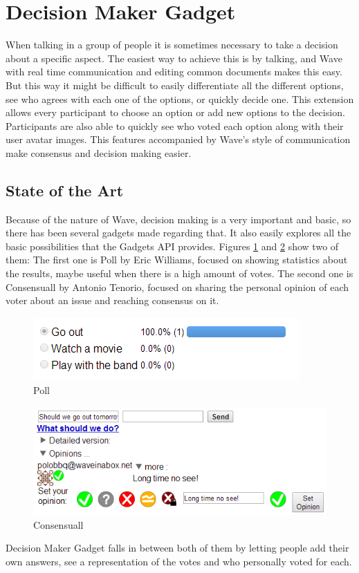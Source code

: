 \section{Decision Maker Gadget}
When talking in a group of people it is sometimes necessary to take a decision about a specific aspect. The easiest way to achieve this is by talking, and Wave with real time communication and editing common documents makes this easy. But this way it might be difficult to easily differentiate all the different options, see who agrees with each one of the options, or quickly decide one. This extension allows every participant to choose an option or add new options to the decision. Participants are also able to quickly see who voted each option along with their user avatar images. This features accompanied by Wave's style of communication make consensus and decision making easier.

\label{subsec:decision_soa}
\subsection{State of the Art}
Because of the nature of Wave, decision making is a very important and basic, so there has been several gadgets made regarding that. It also easily explores all the basic possibilities that the Gadgets API provides. Figures \ref{fig:poll} and \ref{fig:consensuall} show two of them: The first one is Poll by Eric Williams, focused on showing statistics about the results, maybe useful when there is a high amount of votes. The second one is Consensuall by Antonio Tenorio, focused on sharing the personal opinion of each voter about an issue and reaching consensus on it.\\[.2cm]
\begin{figure}[H]
  \center
    \includegraphics[keepaspectratio, scale=0.7]{Media/Captures/Extensions/DecisionGadgets/other.png}
  \caption{Poll}
  \label{fig:poll}
\end{figure}
\begin{figure}[h]
  \center    
    \includegraphics[keepaspectratio, scale=0.7]{Media/Captures/Extensions/DecisionGadgets/consensuall.png}
  \caption{Consensuall}
  \label{fig:consensuall}
\end{figure}
Decision Maker Gadget falls in between both of them by letting people add their own answers, see a representation of the votes and who personally voted for each.

